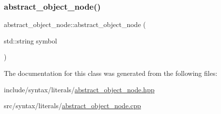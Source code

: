 \subsubsection{\texorpdfstring{abstract\+\_\+object\+\_\+node()}{abstract\_object\_node()}}
{\footnotesize\ttfamily abstract\+\_\+object\+\_\+node\+::abstract\+\_\+object\+\_\+node (\begin{DoxyParamCaption}\item[{std\+::string}]{symbol }\end{DoxyParamCaption})}



The documentation for this class was generated from the following files\+:\begin{DoxyCompactItemize}
\item 
include/syntax/literals/\hyperlink{abstract__object__node_8hpp}{abstract\+\_\+object\+\_\+node.\+hpp}\item 
src/syntax/literals/\hyperlink{abstract__object__node_8cpp}{abstract\+\_\+object\+\_\+node.\+cpp}\end{DoxyCompactItemize}
